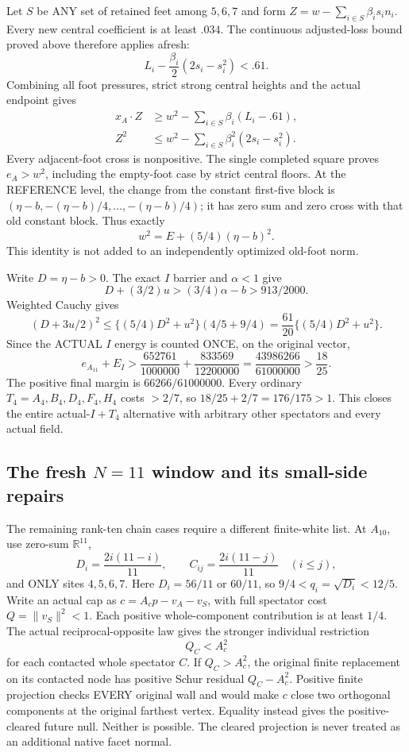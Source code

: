 \documentclass[11pt]{article}
\begin{document}
Let \(S\) be ANY set of retained feet among
\(5,6,7\) and form
\(Z=w-\sum_{i\in S}\beta_i s_i n_i\).
Every new central coefficient is at least
\(.034\).
The continuous adjusted-loss bound proved
above therefore applies afresh:
\[
 L_i-\frac{\beta_i}{2}(2s_i-s_i^2)<.61 .
\]
Combining all foot pressures, strict strong
central heights and the actual endpoint gives
\[
 \begin{split}
 x_A\cdot Z&\ge w^2-\sum_{i\in S}\beta_i(L_i-.61),\\
 Z^2&\le w^2-\sum_{i\in S}\beta_i^2(2s_i-s_i^2).
 \end{split}
\]
Every adjacent-foot cross is nonpositive.
The single completed square proves \(e_A>w^2\),
including the empty-foot case by strict
central floors.
At the REFERENCE level, the change from
the constant first-five block is
\((\eta-b,-(\eta-b)/4,\ldots,-(\eta-b)/4)\);
it has zero sum and zero cross with that
old constant block.
Thus exactly
\[
                      w^2=E+(5/4)(\eta-b)^2 .
\]
This identity is not added to an independently
optimized old-foot norm.

Write \(D=\eta-b>0\).
The exact \(I\) barrier and \(\alpha<1\) give
\[
 D+(3/2)u>(3/4)\alpha-b>913/2000 .
\]
Weighted Cauchy gives
\[
 (D+3u/2)^2
       \le\{(5/4)D^2+u^2\}(4/5+9/4)
       ={\frac{61}{20}}\{(5/4)D^2+u^2\}.
\]
Since the ACTUAL \(I\) energy is counted
ONCE, on the original vector,
\[
 e_{A_{11}}+E_I
 >{\frac{652761}{1000000}}+{\frac{833569}{12200000}}
 ={\frac{43986266}{61000000}}>{\frac{18}{25}}.
\tag{A11Irate}\label{eq:arithA11Ijoint}
\]
The positive final margin is
\(66266/61000000\).
Every ordinary \(T_4=A_4,B_4,D_4,F_4,H_4\)
costs \(>2/7\), so
\(18/25+2/7=176/175>1\).
This closes the entire actual-\(I+T_4\)
alternative with arbitrary other spectators
and every actual field.

\subsection[The fresh N=11 window and its small-side repairs]{The fresh \(N=11\) window and its small-side repairs}
\label{app:arithA10window}

The remaining rank-ten chain cases require a
different finite-white list.
At \(A_{10}\), use zero-sum \(\mathbb R^{11}\),
\[
 D_i={\frac{2i(11-i)}{11}},\qquad
 C_{ij}={\frac{2i(11-j)}{11}}\quad(i\le j),
\]
and ONLY sites \(4,5,6,7\).
Here \(D_i=56/11\) or \(60/11\), so
\(9/4<q_i=\sqrt{D_i}<12/5\).
Write an actual cap as
\(c=A_cp-v_A-v_S\), with full spectator
cost \(Q=\|v_S\|^2<1\).
Each positive whole-component contribution
is at least \(1/4\).
The actual reciprocal-opposite law gives the
stronger individual restriction
\[
                         Q_C<A_c^2
\tag{A10foreign}\label{eq:arithA10foreign}
\]
for each contacted whole spectator \(C\).
If \(Q_C>A_c^2\), the original finite
replacement on its contacted node has
positive Schur residual \(Q_C-A_c^2\).
Positive finite projection checks EVERY
original wall and would make \(c\) close
two orthogonal components at the original
farthest vertex.
Equality instead gives the positive-cleared
future null.
Neither is possible.
The cleared projection is never treated as
an additional native facet normal.
\end{document}
